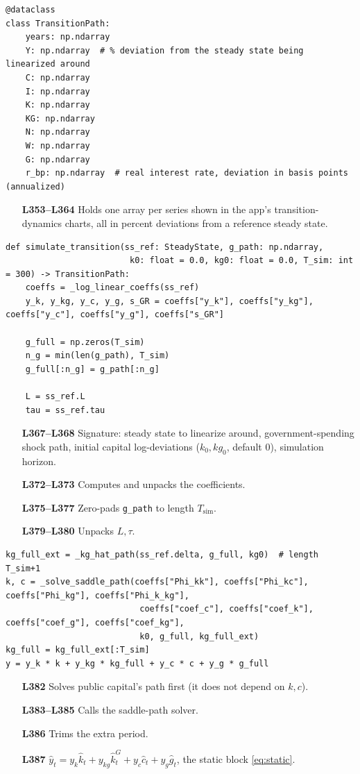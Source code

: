 \documentclass[11pt]{article}
\begin{document}
\begin{lstlisting}[firstnumber=353]
@dataclass
class TransitionPath:
    years: np.ndarray
    Y: np.ndarray  # % deviation from the steady state being linearized around
    C: np.ndarray
    I: np.ndarray
    K: np.ndarray
    KG: np.ndarray
    N: np.ndarray
    W: np.ndarray
    G: np.ndarray
    r_bp: np.ndarray  # real interest rate, deviation in basis points (annualized)
\end{lstlisting}
\begin{itemize}
\item[\textbf{L353--L364}] Holds one array per series shown in the app's
transition-dynamics charts, all in percent deviations from a reference
steady state.
\end{itemize}

\begin{lstlisting}[firstnumber=367]
def simulate_transition(ss_ref: SteadyState, g_path: np.ndarray,
                         k0: float = 0.0, kg0: float = 0.0, T_sim: int = 300) -> TransitionPath:
    coeffs = _log_linear_coeffs(ss_ref)
    y_k, y_kg, y_c, y_g, s_GR = coeffs["y_k"], coeffs["y_kg"], coeffs["y_c"], coeffs["y_g"], coeffs["s_GR"]

    g_full = np.zeros(T_sim)
    n_g = min(len(g_path), T_sim)
    g_full[:n_g] = g_path[:n_g]

    L = ss_ref.L
    tau = ss_ref.tau
\end{lstlisting}
\begin{itemize}
\item[\textbf{L367--L368}] Signature: steady state to linearize around,
government-spending shock path, initial capital log-deviations
($k_0,kg_0$, default $0$), simulation horizon.
\item[\textbf{L372--L373}] Computes and unpacks the coefficients.
\item[\textbf{L375--L377}] Zero-pads \texttt{g\_path} to length
$T_{\text{sim}}$.
\item[\textbf{L379--L380}] Unpacks $L,\tau$.
\end{itemize}

\begin{lstlisting}[firstnumber=382]
kg_full_ext = _kg_hat_path(ss_ref.delta, g_full, kg0)  # length T_sim+1
k, c = _solve_saddle_path(coeffs["Phi_kk"], coeffs["Phi_kc"], coeffs["Phi_kg"], coeffs["Phi_k_kg"],
                           coeffs["coef_c"], coeffs["coef_k"], coeffs["coef_g"], coeffs["coef_kg"],
                           k0, g_full, kg_full_ext)
kg_full = kg_full_ext[:T_sim]
y = y_k * k + y_kg * kg_full + y_c * c + y_g * g_full
\end{lstlisting}
\begin{itemize}
\item[\textbf{L382}] Solves public capital's path first (it does not
depend on $k,c$).
\item[\textbf{L383--L385}] Calls the saddle-path solver.
\item[\textbf{L386}] Trims the extra period.
\item[\textbf{L387}] $\hat y_t=y_k\hat k_t+y_{kg}\hat k^G_t+y_c\hat
c_t+y_g\hat g_t$, the static block \eqref{eq:static}.
\end{itemize}
\end{document}
